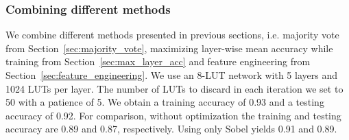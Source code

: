 \subsubsection{Combining different methods}
We combine different methods presented in previous sections, i.e. majority vote from Section~\ref{sec:majority_vote}, maximizing layer-wise mean accuracy while training from Section~\ref{sec:max_layer_acc} and feature engineering from Section~\ref{sec:feature_engineering}. We use an 8-LUT network with 5 layers and 1024 LUTs per layer. The number of LUTs to discard in each iteration we set to 50 with a patience of 5. We obtain a training accuracy of 0.93 and a testing accuracy of 0.92. For comparison, without optimization the training and testing accuracy are 0.89 and 0.87, respectively. Using only Sobel yields 0.91 and 0.89.
